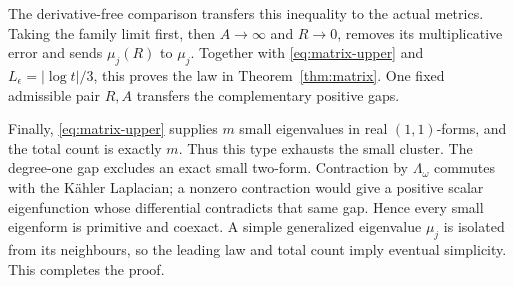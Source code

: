 The derivative-free comparison transfers this inequality to the actual
metrics. Taking the family limit first, then $A\to\infty$ and
$R\to0$, removes its multiplicative error and sends $\mu_j(R)$ to
$\mu_j$. Together with \eqref{eq:matrix-upper} and
$L_\epsilon=|\log t|/3$, this proves the law in
Theorem~\ref{thm:matrix}. One fixed admissible pair $R,A$ transfers
the complementary positive gaps.

Finally, \eqref{eq:matrix-upper} supplies $m$ small eigenvalues in
real $(1,1)$-forms, and the total count is exactly $m$. Thus this type
exhausts the small cluster. The degree-one gap excludes an exact small
two-form. Contraction by $\Lambda_\omega$ commutes with the K\"ahler
Laplacian; a nonzero contraction would give a positive scalar eigenfunction
whose differential contradicts that same gap. Hence every small
eigenform is primitive and coexact. A simple generalized eigenvalue
$\mu_j$ is isolated from its neighbours, so the leading law and total
count imply eventual simplicity. This completes the proof.
